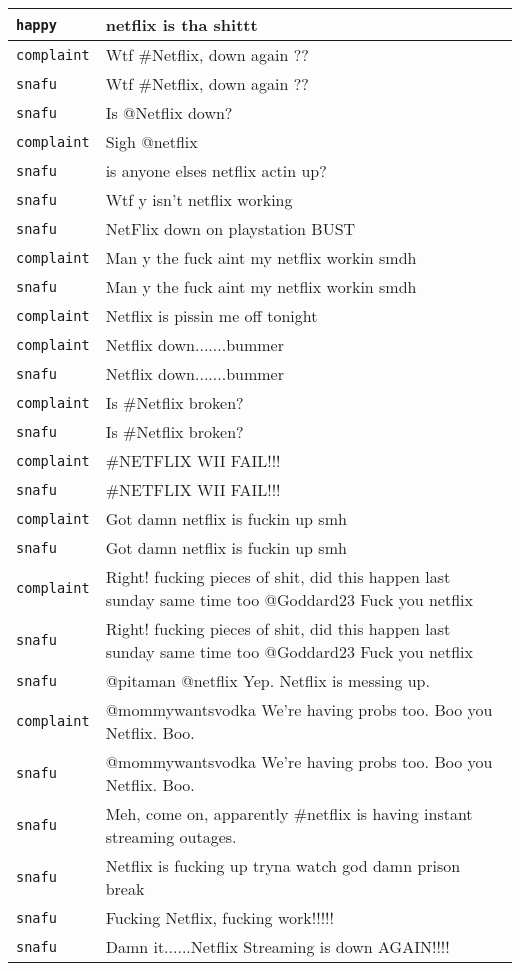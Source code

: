 {\begin{longtable}{|l|p{160mm}|}
         \texttt{happy} & netflix is tha shittt
      \tabularnewline\hline
         \texttt{complaint} & Wtf \#Netflix, down again ??
      \tabularnewline\hline
         \texttt{snafu} & Wtf \#Netflix, down again ??
      \tabularnewline\hline
         \texttt{snafu} & Is @Netflix down?
      \tabularnewline\hline
         \texttt{complaint} & Sigh @netflix
      \tabularnewline\hline
         \texttt{snafu} & is anyone elses netflix actin up?
      \tabularnewline\hline
         \texttt{snafu} & Wtf y isn't netflix working
      \tabularnewline\hline
         \texttt{snafu} & NetFlix down on playstation BUST
      \tabularnewline\hline
         \texttt{complaint} & Man y the fuck aint my netflix workin smdh
      \tabularnewline\hline
         \texttt{snafu} & Man y the fuck aint my netflix workin smdh
      \tabularnewline\hline
         \texttt{complaint} & Netflix is pissin me off tonight
      \tabularnewline\hline
         \texttt{complaint} & Netflix down.......bummer
      \tabularnewline\hline
         \texttt{snafu} & Netflix down.......bummer
      \tabularnewline\hline
         \texttt{complaint} & Is \#Netflix broken?
      \tabularnewline\hline
         \texttt{snafu} & Is \#Netflix broken?
      \tabularnewline\hline
         \texttt{complaint} & \#NETFLIX WII FAIL!!!
      \tabularnewline\hline
         \texttt{snafu} & \#NETFLIX WII FAIL!!!
      \tabularnewline\hline
         \texttt{complaint} & Got damn netflix is fuckin up smh
      \tabularnewline\hline
         \texttt{snafu} & Got damn netflix is fuckin up smh
      \tabularnewline\hline
         \texttt{complaint} & Right! fucking pieces of shit, did this happen last sunday same time too @Goddard23 Fuck you netflix
      \tabularnewline\hline
         \texttt{snafu} & Right! fucking pieces of shit, did this happen last sunday same time too @Goddard23 Fuck you netflix
      \tabularnewline\hline
         \texttt{snafu} & @pitaman @netflix Yep. Netflix is messing up.
      \tabularnewline\hline
         \texttt{complaint} & @mommywantsvodka We're having probs too. Boo you Netflix. Boo.
      \tabularnewline\hline
         \texttt{snafu} & @mommywantsvodka We're having probs too. Boo you Netflix. Boo.
      \tabularnewline\hline
         \texttt{snafu} & Meh, come on, apparently \#netflix is having instant streaming outages.
      \tabularnewline\hline
         \texttt{snafu} & Netflix is fucking up tryna watch god damn prison break
      \tabularnewline\hline
         \texttt{snafu} & Fucking Netflix, fucking work!!!!!
      \tabularnewline\hline
         \texttt{snafu} & Damn it......Netflix Streaming is down AGAIN!!!!

\end{longtable}}
